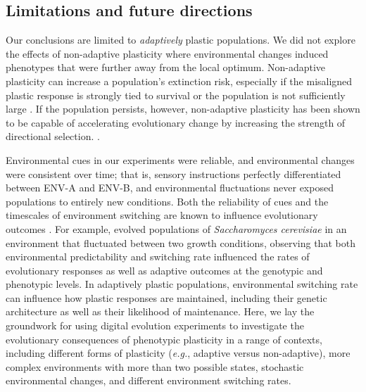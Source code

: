 \subsection{Limitations and future directions}


Our conclusions are limited to \textit{adaptively} plastic populations.
We did not explore the effects of non-adaptive plasticity where environmental changes induced phenotypes that were further away from the local optimum.
Non-adaptive plasticity can increase a population's extinction risk, especially if the misaligned plastic response is strongly tied to survival or the population is not sufficiently large \citep{gomulkiewicz_when_1995,chevin_adaptation_2010}.
If the population persists, however, non-adaptive plasticity has been shown to be capable of accelerating evolutionary change by increasing the strength of directional selection. \citep{ghalambor_non-adaptive_2015}.

Environmental cues in our experiments were reliable, and environmental changes were consistent over time; that is, sensory instructions perfectly differentiated between ENV-A and ENV-B, and environmental fluctuations never exposed populations to entirely new conditions.
Both the reliability of cues and the timescales of environment switching are known to influence evolutionary outcomes \citep{li_digital_2004,boyer_adaptation_2021}. %
For example, \cite{boyer_adaptation_2021} evolved populations of \textit{Saccharomyces cerevisiae} in an environment that fluctuated between two growth conditions, observing that both environmental predictability and switching rate influenced the rates of evolutionary responses as well as adaptive outcomes at the genotypic and phenotypic levels. %
In adaptively plastic populations, environmental switching rate can influence how plastic responses are maintained, including their genetic architecture as well as their likelihood of maintenance. 
Here, we lay the groundwork for using digital evolution experiments to investigate the evolutionary consequences of phenotypic plasticity in a range of contexts, including different forms of plasticity (\textit{e.g.}, adaptive versus non-adaptive), more complex environments with more than two possible states, stochastic environmental changes, and different environment switching rates.

